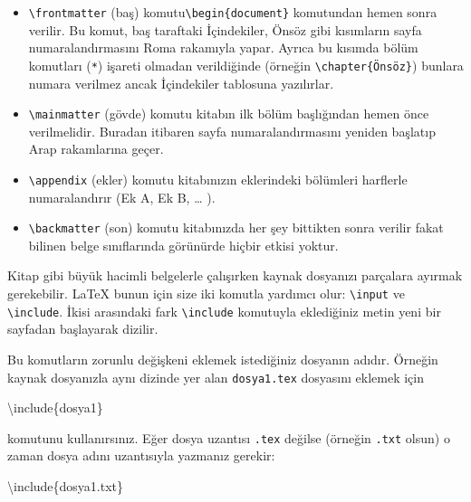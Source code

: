 \documentclass[
  10pt,
]{scrbook}
\newenvironment{Shaded}{\begin{snugshade}}{\end{snugshade}}
\newcommand{\NormalTok}[1]{#1}
\providecommand{\tightlist}{%
  \setlength{\itemsep}{0pt}\setlength{\parskip}{0pt}}
\begin{document}
\begin{itemize}
\tightlist
\item
  \texttt{\textbackslash{}frontmatter} (baş) komutu\texttt{\textbackslash{}begin\{document\}} komutundan hemen
  sonra verilir. Bu komut, baş taraftaki İçindekiler, Önsöz gibi
  kısımların sayfa numaralandırmasını Roma rakamıyla yapar. Ayrıca bu
  kısımda bölüm komutları (\texttt{*}) işareti olmadan verildiğinde (örneğin
  \texttt{\textbackslash{}chapter\{Önsöz\}}) bunlara numara verilmez ancak İçindekiler
  tablosuna yazılırlar.
\item
  \texttt{\textbackslash{}mainmatter} (gövde) komutu kitabın ilk bölüm başlığından hemen
  önce verilmelidir. Buradan itibaren sayfa numaralandırmasını yeniden
  başlatıp Arap rakamlarına geçer.
\item
  \texttt{\textbackslash{}appendix} (ekler) komutu kitabınızın eklerindeki bölümleri
  harflerle numaralandırır (Ek A, Ek B, \ldots{} ).
\item
  \texttt{\textbackslash{}backmatter} (son) komutu kitabınızda her şey bittikten sonra
  verilir fakat bilinen belge sınıflarında görünürde hiçbir etkisi
  yoktur.
\end{itemize}

Kitap gibi büyük hacimli belgelerle çalışırken kaynak dosyanızı
parçalara ayırmak gerekebilir. LaTeX bunun için size iki komutla
yardımcı olur: \texttt{\textbackslash{}input} ve \texttt{\textbackslash{}include}. İkisi arasındaki fark \texttt{\textbackslash{}include}
komutuyla eklediğiniz metin yeni bir sayfadan başlayarak dizilir.

Bu komutların zorunlu değişkeni eklemek istediğiniz dosyanın adıdır.
Örneğin kaynak dosyanızla aynı dizinde yer alan \texttt{dosya1.tex} dosyasını
eklemek için

\begin{Shaded}
\begin{Highlighting}[]
\NormalTok{\textbackslash{}include\{dosya1\}}
\end{Highlighting}
\end{Shaded}

komutunu kullanırsınız. Eğer dosya uzantısı \texttt{.tex} değilse (örneğin
\texttt{.txt} olsun) o zaman dosya adını uzantısıyla yazmanız gerekir:

\begin{Shaded}
\begin{Highlighting}[]
\NormalTok{\textbackslash{}include\{dosya1.txt\}}
\end{Highlighting}
\end{Shaded}
\end{document}
